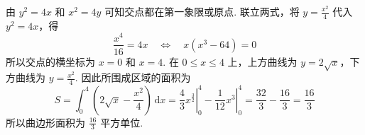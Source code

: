 \begin{solution}

由 \(y^2=4x\) 和 \(x^2=4y\) 可知交点都在第一象限或原点. 联立两式，将 \(y=\frac{x^2}{4}\) 代入 \(y^2=4x\)，得
\[
\frac{x^4}{16}=4x
\quad\Longleftrightarrow\quad
x\left( x^3-64 \right)=0
\]
所以交点的横坐标为 \(x=0\) 和 \(x=4\). 在 \(0\leqslant x\leqslant4\) 上，上方曲线为 \(y=2\sqrt{x}\)，下方曲线为 \(y=\frac{x^2}{4}\). 因此所围成区域的面积为
\[
S=\int_0^4\left( 2\sqrt{x}-\frac{x^2}{4} \right)\,\mathrm{d}x
=\left.\frac{4}{3}x^{\frac{3}{2}}\right|_0^4-\left.\frac{1}{12}x^3\right|_0^4
=\frac{32}{3}-\frac{16}{3}=\frac{16}{3}
\]
所以曲边形面积为 \(\frac{16}{3}\) 平方单位.
\end{solution}
